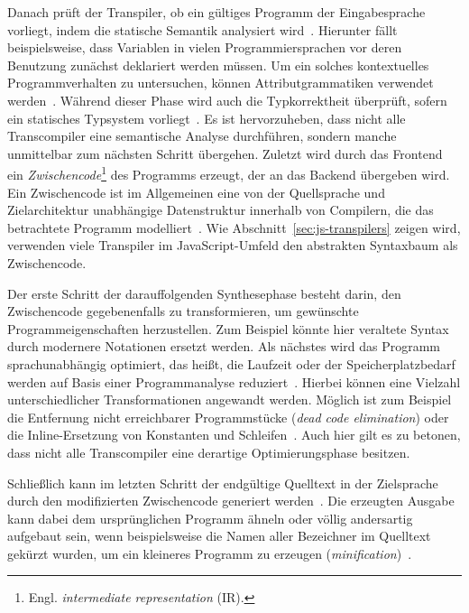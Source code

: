 Danach prüft der Transpiler, ob ein gültiges Programm der Eingabesprache vorliegt, indem die statische Semantik analysiert wird~\autocite[8]{AHO:COMPILERS}. Hierunter fällt beispielsweise, dass Variablen in vielen Programmiersprachen vor deren Benutzung zunächst deklariert werden müssen. Um ein solches kontextuelles Programmverhalten zu untersuchen, können Attributgrammatiken verwendet werden~\autocite[161]{TORCZON:2007}. Während dieser Phase wird auch die Typkorrektheit überprüft, sofern ein statisches Typsystem vorliegt~\autocite{SCHOEPP:COMPILER}. Es ist hervorzuheben, dass nicht alle Transcompiler eine semantische Analyse durchführen, sondern manche unmittelbar zum nächsten Schritt übergehen.
Zuletzt wird durch das Frontend ein \emph{Zwischencode}\footnote{Engl. \textit{intermediate representation} (IR).} des Programms erzeugt, der an das Backend übergeben wird. Ein Zwischencode ist im Allgemeinen eine von der Quellsprache und Zielarchitektur unabhängige Datenstruktur innerhalb von Compilern, die das betrachtete Programm modelliert~\autocite[6]{TORCZON:2007}. Wie Abschnitt~\ref{sec:js-transpilers} zeigen wird, verwenden viele Transpiler im JavaScript-Umfeld den abstrakten Syntaxbaum als Zwischencode.

Der erste Schritt der darauffolgenden Synthesephase besteht darin, den Zwischencode gegebenenfalls zu transformieren, um gewünschte Programmeigenschaften herzustellen. Zum Beispiel könnte hier veraltete Syntax durch modernere Notationen ersetzt werden. Als nächstes wird das Programm sprachunabhängig optimiert, das heißt, die Laufzeit oder der Speicherplatzbedarf werden auf Basis einer Programmanalyse reduziert~\autocite[405]{TORCZON:2007}. Hierbei können eine Vielzahl unterschiedlicher Transformationen angewandt werden. Möglich ist zum Beispiel die Entfernung nicht erreichbarer Programmstücke (\textit{dead code elimination}) oder die Inline-Ersetzung von Konstanten und Schleifen~\autocites{TORCZON:2007}{SCHOEPP:COMPILER}. Auch hier gilt es zu betonen, dass nicht alle Transcompiler eine derartige Optimierungsphase besitzen.

Schließlich kann im letzten Schritt der endgültige Quelltext in der Zielsprache durch den modifizierten Zwischencode generiert werden~\autocite[505]{AHO:COMPILERS}. Die erzeugten Ausgabe kann dabei dem ursprünglichen Programm ähneln oder völlig andersartig aufgebaut sein, wenn beispielsweise die Namen aller Bezeichner im Quelltext gekürzt wurden, um ein kleineres Programm zu erzeugen (\textit{minification})~\autocite{FOWLER:TRANSPARENT}.

